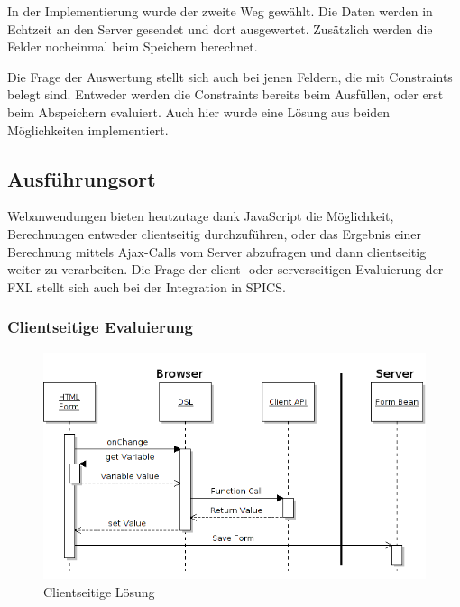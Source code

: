 In der Implementierung wurde der zweite Weg gewählt. Die Daten werden in Echtzeit an den Server gesendet und dort ausgewertet. Zu\-sätz\-lich werden die Felder nocheinmal beim Speichern berechnet.

Die Frage der Auswertung stellt sich auch bei jenen Feldern, die mit Constraints belegt sind. Entweder werden die Constraints bereits beim Ausfüllen, oder erst beim Abspeichern evaluiert. Auch hier wurde eine Lösung aus beiden Möglichkeiten implementiert. 


\subsection{Aus\-führ\-ungsort}
\label{integration_ausfuehrungsort}

Webanwendungen bieten heutzutage dank Java\-Script die Möglichkeit, Berechnungen entweder clientseitig durchzuführen, oder das Ergebnis einer Berechnung mittels Ajax-Calls vom Server abzufragen und dann clientseitig weiter zu verarbeiten. Die Frage der client- oder serverseitigen Evaluierung der FXL stellt sich auch bei der Integration in SPICS.

\subsubsection{Clientseitige Evaluierung}

\begin{figure}[th]
\begin{center}
\includegraphics[scale=0.55]{figures/uml_seq_client_neu}
\end{center}

\caption{Clientseitige Lösung}
\label{abb_uml_seq_client}
\end{figure}


